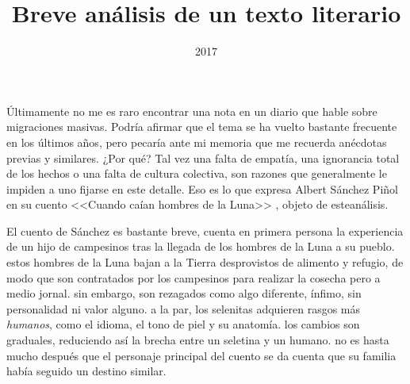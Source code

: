 \documentclass[a3paper]{tufte-handout}
\title{Breve análisis de un texto literario}
\date{2017}
\begin{document}
 \maketitle
 Últimamente no me es raro encontrar una nota en un diario que hable sobre migraciones masivas. Podría afirmar que el tema se ha vuelto bastante frecuente en los últimos años, pero pecaría ante mi memoria que me recuerda anécdotas previas y similares. ¿Por qué? Tal vez una falta de empatía, una ignorancia total de los hechos o una falta de cultura colectiva, son razones que generalmente le impiden a uno fijarse en este detalle. Eso es lo que expresa Albert Sánchez Piñol en su cuento <<Cuando caían hombres de la Luna>> \citep{Albert}, objeto de esteanálisis. 

El cuento de Sánchez es bastante breve, cuenta en primera persona la experiencia de un hijo de campesinos tras la llegada de los hombres de la Luna a su pueblo. estos hombres de la Luna bajan a la Tierra desprovistos de alimento y refugio, de modo que son contratados por los campesinos para realizar la cosecha pero a medio jornal. sin embargo, son rezagados como algo diferente, ínfimo, sin personalidad ni valor alguno. a la par, los selenitas adquieren rasgos más \emph{humanos}, como el idioma, el tono de piel y su anatomía. los cambios son graduales, reduciendo así la brecha entre un seletina y un humano. no es hasta mucho después que el personaje principal del cuento se da cuenta que su familia había seguido un destino similar.
\end{document}
